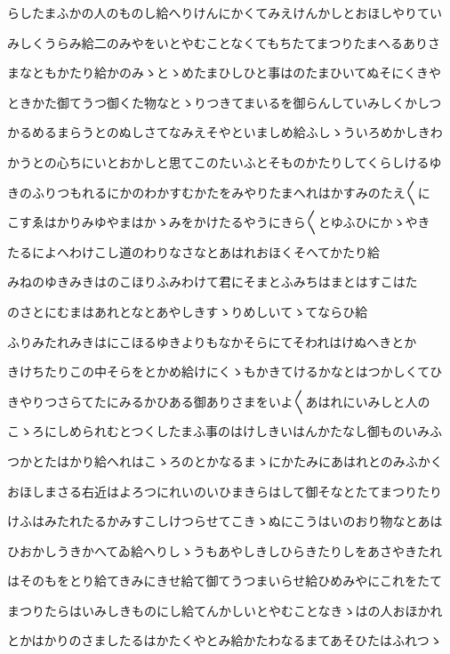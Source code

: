 \documentclass[a4paper,11pt,landscape]{ltjtarticle}
\begin{document}
らしたまふかの人のものし給へりけんにかくてみえけんかしとおほしやりてい
\par\medskip
みしくうらみ給二のみやをいとやむことなくてもちたてまつりたまへるありさ
\par\medskip
まなともかたり給かのみゝとゝめたまひしひと事はのたまひいてぬそにくきや
\par\medskip
ときかた御てうつ御くた物なとゝりつきてまいるを御らんしていみしくかしつ
\par\medskip
かるめるまらうとのぬしさてなみえそやといましめ給ふしゝういろめかしきわ
\par\medskip
かうとの心ちにいとおかしと思てこのたいふとそものかたりしてくらしけるゆ
\par\medskip
きのふりつもれるにかのわかすむかたをみやりたまへれはかすみのたえ〱に
\par\medskip
こすゑはかりみゆやまはかゝみをかけたるやうにきら〱とゆふひにかゝやき
\par\medskip
たるによへわけこし道のわりなさなとあはれおほくそへてかたり給
\par\medskip
みねのゆきみきはのこほりふみわけて君にそまとふみちはまとはすこはた
\par\medskip
のさとにむまはあれとなとあやしきすゝりめしいてゝてならひ給
\par\medskip
ふりみたれみきはにこほるゆきよりもなかそらにてそわれはけぬへきとか
\par\medskip
きけちたりこの中そらをとかめ給けにくゝもかきてけるかなとはつかしくてひ
\par\medskip
きやりつさらてたにみるかひある御ありさまをいよ〱あはれにいみしと人の
\par\medskip
こゝろにしめられむとつくしたまふ事のはけしきいはんかたなし御ものいみふ
\par\medskip
つかとたはかり給へれはこゝろのとかなるまゝにかたみにあはれとのみふかく
\par\medskip
おほしまさる右近はよろつにれいのいひまきらはして御そなとたてまつりたり
\par\medskip
けふはみたれたるかみすこしけつらせてこきゝぬにこうはいのおり物なとあは
\par\medskip
ひおかしうきかへてゐ給へりしゝうもあやしきしひらきたりしをあさやきたれ
\par\medskip
はそのもをとり給てきみにきせ給て御てうつまいらせ給ひめみやにこれをたて
\par\medskip
まつりたらはいみしきものにし給てんかしいとやむことなきゝはの人おほかれ
\par\medskip
とかはかりのさましたるはかたくやとみ給かたわなるまてあそひたはふれつゝ
\end{document}
